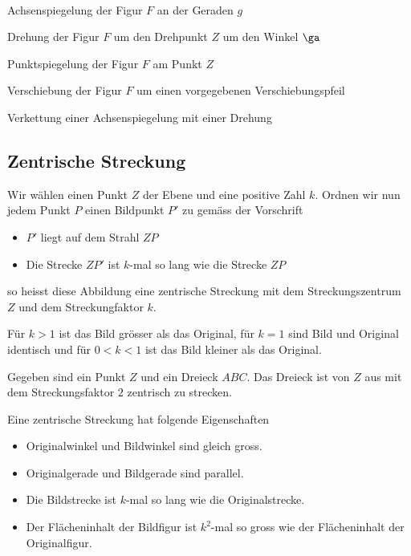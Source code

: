 \documentclass[%
11pt,%
twoside,%
titlepage,%
german,%
headsepline%
]{scrartcl}
\begin{document}
\begin{bsps}
\ \\[-2ex]
\begin{enumeratea}
\item Achsenspiegelung der Figur $F$ an der Geraden $g$%
\item Drehung der Figur $F$ um den Drehpunkt $Z$ um den Winkel $\ga$%
\item Punktspiegelung der Figur $F$ am Punkt $Z$%
\item Verschiebung der Figur $F$ um einen vorgegebenen Verschiebungspfeil%
\item Verkettung einer Achsenspiegelung mit einer Drehung
\end{enumeratea}
\end{bsps}

\subsection{Zentrische Streckung}
Wir w\"ahlen einen Punkt $Z$ der Ebene und eine positive Zahl $k$. Ordnen wir nun jedem Punkt $P$ einen Bildpunkt $P'$ zu gem\"ass der Vorschrift
\begin{itemize}
\item $P'$ liegt auf dem Strahl $ZP$
\item Die Strecke $ZP'$ ist $k$-mal so lang wie die Strecke $ZP$
\end{itemize}
so heisst diese Abbildung eine zentrische Streckung mit dem Streckungszentrum $Z$ und dem Streckungfaktor $k$.%

F\"ur $k>1$ ist das Bild gr\"osser als das Original, f\"ur $k=1$ sind Bild und Original identisch und f\"ur $0<k<1$ ist das Bild kleiner als das Original.

\begin{bsp} Gegeben sind ein Punkt $Z$ und ein Dreieck $ABC$. Das Dreieck ist von $Z$ aus mit dem Streckungsfaktor $2$ zentrisch zu strecken.%
\end{bsp}
Eine zentrische Streckung hat folgende Eigenschaften
\begin{itemize}
\item Originalwinkel und Bildwinkel sind gleich gross.
\item Originalgerade und Bildgerade sind parallel.
\item Die Bildstrecke ist $k$-mal so lang wie die Originalstrecke.
\item Der Fl\"acheninhalt der Bildfigur ist $k^2$-mal so gross wie der Fl\"acheninhalt der Originalfigur.
\end{itemize}
\end{document}
